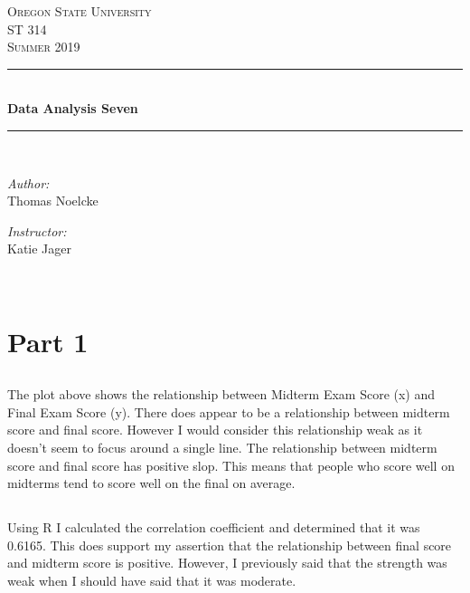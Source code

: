 \documentclass[letterpaper, onecolumn,10pt]{IEEEtran}
\begin{document}
    \begin{titlepage}
    \newcommand{\HRule}{\rule{\linewidth}{0.5mm}}
    \center
    \textsc{\Large Oregon State University}\\[1.5cm]
    \textsc{\Large ST 314}\\[0.5cm]
    \textsc{\Large Summer 2019}\\[0.5cm]
    \HRule \\[0.4cm]
    { \huge \bfseries Data Analysis Seven}\\[0.4cm] %
    \HRule \\[1.5cm]
    \begin{minipage}{0.4\textwidth}
        \begin{flushleft} \large
        \emph{Author:}\\
        Thomas Noelcke
        \end{flushleft}
    \end{minipage}
    \begin{minipage}{0.4\textwidth}
        \begin{flushright} \large
        \emph{Instructor:} \\
        Katie Jager\\
        \end{flushright}
    \end{minipage}\\[2cm]
		\end{titlepage}
        
        \section{Part 1}
            \subsection{}
            
            
            The plot above shows the relationship between Midterm Exam Score (x) and Final Exam Score (y). There does appear to be a relationship between midterm score and final score. However I would consider this relationship weak as it doesn't seem to focus around a single line. The relationship between midterm score and final score has positive slop. This means that people who score well on midterms tend to score well on the final on average.\\
            
            \subsection{}
            Using R I calculated the correlation coefficient and determined that it was 0.6165. This does support my assertion that the relationship between final score and midterm score is positive. However, I previously said that the strength was weak when I should have said that it was moderate.\\
        
\end{document}
